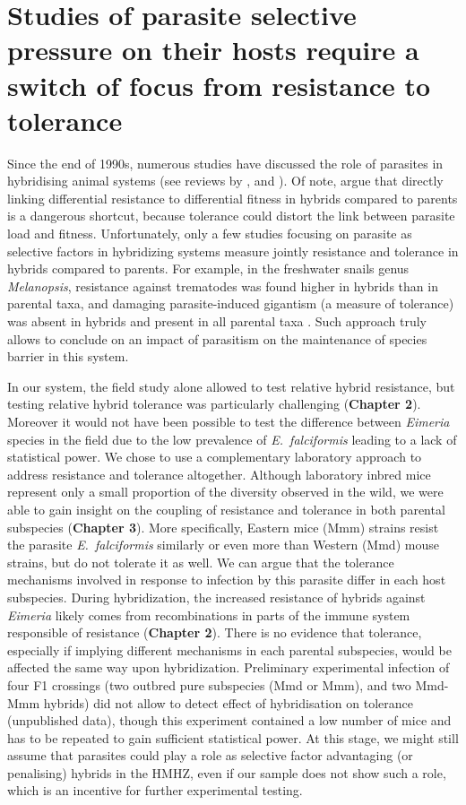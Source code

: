 \section{Studies of parasite selective pressure on their hosts require a switch of focus from resistance to tolerance}
Since the end of 1990s, numerous studies have discussed the role of parasites in hybridising animal systems (see reviews by \cite{fritz_resistance_1999}, \cite{karvonen_role_2012} and \cite{theodosopoulos_parasites_2019}). Of note, \cite{baird_shifting_2019} argue that directly linking differential resistance to differential fitness in hybrids compared to parents is a dangerous shortcut, because tolerance could distort the link between parasite load and fitness. Unfortunately, only a few studies focusing on parasite as selective factors in hybridizing systems measure jointly resistance and tolerance in hybrids compared to parents. For example, in the freshwater snails genus \textit{Melanopsis}, resistance against trematodes was found higher in hybrids than in parental taxa, and damaging parasite-induced gigantism (a measure of tolerance) was absent in hybrids and present in all parental taxa \citep{guttel_maintenance_2014}. Such approach truly allows to conclude on an impact of parasitism on the maintenance of species barrier in this system. 
\par
In our system, the field study alone allowed to test relative hybrid resistance, but testing relative hybrid tolerance was particularly challenging (\textbf{Chapter 2}). Moreover it would not have been possible to test the difference between \textit{Eimeria} species in the field due to the low prevalence of \textit{E.~falciformis} leading to a lack of statistical power. We chose to use a complementary laboratory approach to address resistance and tolerance altogether. Although laboratory inbred mice represent only a small proportion of the diversity observed in the wild, we were able to gain insight on the coupling of resistance and tolerance in both parental subspecies (\textbf{Chapter 3}). More specifically, Eastern mice (Mmm) strains resist the parasite \textit{E.~falciformis} similarly or even more than Western (Mmd) mouse strains, but do not tolerate it as well. We can argue that the tolerance mechanisms involved in response to infection by this parasite differ in each host subspecies. During hybridization, the increased resistance of hybrids against \textit{Eimeria} likely comes from recombinations in parts of the immune system responsible of resistance (\textbf{Chapter 2}). There is no evidence that tolerance, especially if implying different mechanisms in each parental subspecies, would be affected the same way upon hybridization. Preliminary experimental infection of four F1 crossings (two outbred pure subspecies (Mmd or Mmm), and two Mmd-Mmm hybrids) did not allow to detect effect of hybridisation on tolerance (unpublished data), though this experiment contained a low number of mice and has to be repeated to gain sufficient statistical power. At this stage, we might still assume that parasites could play a role as selective factor advantaging (or penalising) hybrids in the HMHZ, even if our sample does not show such a role, which is an incentive for further experimental testing.

